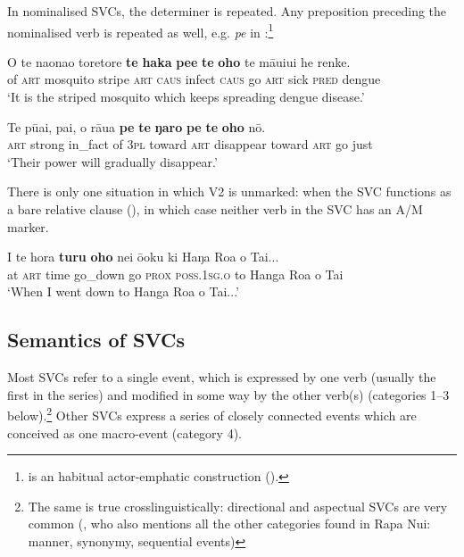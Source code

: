 In nominalised SVCs, the determiner is repeated. Any preposition preceding the nominalised verb is repeated as well, e.g. \textit{pe} in :\footnote{\label{fn:376} is an habitual actor-emphatic construction ().}

\ea\label{ex:7.175}
\gll O te naonao toretore \textbf{te} \textbf{haka} \textbf{pe{\ꞌ}e} \textbf{te} \textbf{oho} te māuiui he renke. \\
of \textsc{art} mosquito stripe \textsc{art} \textsc{caus} infect \textsc{caus} go \textsc{art} sick \textsc{pred} dengue \\

\glt 
‘It is the striped mosquito which keeps spreading dengue disease.’ \textstyleExampleref{[R535.051]} 
\z

\ea\label{ex:7.176}
\gll Te pūai, pa{\ꞌ}i, o rāua \textbf{pe} \textbf{te} \textbf{ŋaro} \textbf{pe} \textbf{te} \textbf{oho} nō.\\
\textsc{art} strong in\_fact of \textsc{3pl} toward \textsc{art} disappear toward \textsc{art} go just\\

\glt
‘Their power will gradually disappear.’ \textstyleExampleref{[1 Cor. 2:6]}
\z

There is only one situation in which V2 is unmarked: when the SVC functions as a bare relative clause (), in which case neither verb in the SVC has an A/M marker.

\ea\label{ex:7.177}
\gll {\ꞌ}I te hora \textbf{turu} \textbf{oho} nei ō{\ꞌ}oku ki Haŋa Roa o Tai... \\
at \textsc{art} time go\_down go \textsc{prox} \textsc{poss.1sg.o} to Hanga Roa o Tai \\

\glt 
‘When I went down to Hanga Roa o Tai...’ \textstyleExampleref{[R230.059]} 
\z

\subsection{Semantics of SVCs}\label{sec:7.7.3}

Most SVCs refer to a single event, which is expressed by one verb (usually the first in the series) and modified in some way by the other verb(s) (categories 1–3 below).\footnote{\label{fn:377}The same is true crosslinguistically: directional and aspectual SVCs are very common (\citealt{Aikhenvald2006}, who also mentions all the other categories found in Rapa Nui: manner, synonymy, sequential events)} Other SVCs express a series of closely connected events which are conceived as one macro-event (category 4).

